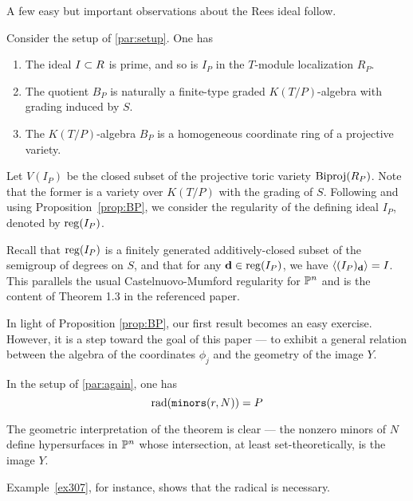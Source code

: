 \documentclass[fleqn,reqno]{amsart}
\begin{document}
\begin{paragraf*}
A few easy but important observations about the Rees ideal follow.
\end{paragraf*}

\begin{proposition}
\label{prop:BP} Consider the setup of \eqref{par:setup}. One has
\begin{enumerate}
\item
The ideal $I\subset R$ is prime, and so is $I_P$ in the $T$-module localization $R_P$.

\item
The quotient $B_P$ is naturally a finite-type graded $K(T/P)$-algebra with grading induced by $S$.

\item\label{itm:BPKTP-alg}
The $K(T/P)$-algebra $B_P$ is a homogeneous coordinate ring of a projective variety.
\end{enumerate}
\end{proposition}

\begin{paragraf}
\label{par:reg-IP}
Let $V(I_P)$ be the closed subset of the projective toric variety $\operatorname{Biproj}(R_P)$.
Note that the former is a variety over $K(T/P)$ with the grading of $S$.
Following \citet{MS-04} and using Proposition~\ref{prop:BP},
we consider the regularity of the defining ideal $I_P$,
denoted by $\operatorname{reg}(I_P)$.

Recall that $\operatorname{reg}(I_P)$ is a finitely generated additively-closed subset
of the semigroup of degrees on $S$, and that
for any $\mathbf d\in\operatorname{reg}(I_P)$, we have $\langle(I_P)_\mathbf d\rangle=I$.
This parallels the usual Castelnuovo-Mumford regularity for $\mathbb{P}^n$
and is the content of Theorem 1.3 in the referenced paper.
\end{paragraf}

\begin{paragraf*}
In light of Proposition \ref{prop:BP}, our first result becomes an easy exercise.
However, it is a step toward the goal of this paper --- to exhibit a general relation between
the algebra of the coordinates $\phi_j$ and the geometry of the image $Y$.
\end{paragraf*}

\begin{theorem}
\label{thm:rad-minors}
In the setup of \eqref{par:again}, one has
\[
	\operatorname{rad}(\mathop{\tt minors}(r,N))=P
\]
\end{theorem}

\begin{paragraf*}
The geometric interpretation of the theorem is clear ---
the nonzero minors of $N$ define hypersurfaces in $\mathbb{P}^n$ whose intersection,
at least set-theoretically, is the image $Y$.

Example~\ref{ex307}, for instance, shows that the radical is necessary.
\end{paragraf*}
\end{document}
